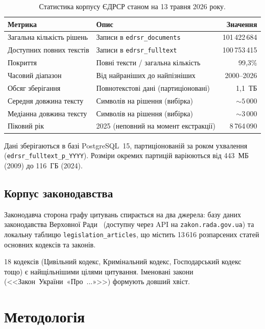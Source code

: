\documentclass[11pt]{article}
\begin{document}
\begin{table}[h]
\centering
\small
\begin{tabularx}{\textwidth}{@{}l X r@{}}
\toprule
\textbf{Метрика} & \textbf{Опис} & \textbf{Значення} \\
\midrule
Загальна кількість рішень & Записи в \texttt{edrsr\_documents} & 101\,422\,684 \\
Доступних повних текстів & Записи в \texttt{edrsr\_fulltext} & 100\,753\,415 \\
Покриття & Повні тексти / загальна кількість & 99,3\% \\
Часовий діапазон & Від найраніших до найпізніших & 2000--2026 \\
Обсяг зберігання & Повнотекстові дані (партиціоновані) & 1,1~ТБ \\
Середня довжина тексту & Символів на рішення (вибірка) & ${\sim}5\,000$ \\
Медіанна довжина тексту & Символів на рішення (вибірка) & ${\sim}3\,000$ \\
Піковий рік & 2025 (неповний на момент екстракції) & 8\,764\,090 \\
\bottomrule
\end{tabularx}
\caption{Статистика корпусу ЄДРСР станом на 13 травня 2026 року.}
\label{tab:corpus}
\end{table}

Дані зберігаються в базі PostgreSQL~15, партиціонованій за роком ухвалення (\texttt{edrsr\_fulltext\_p\_YYYY}).
Розміри окремих партицій варіюються від 443~МБ (2009) до 116~ГБ (2024).

\subsection{Корпус законодавства}

Законодавча сторона графу цитувань спирається на два джерела: базу даних законодавства Верховної Ради~\citep{zakonrada} (доступну через API на \texttt{zakon.rada.gov.ua}) та локальну таблицю \texttt{legislation\_articles}, що містить 13\,616 розпарсених статей основних кодексів та законів.

18 кодексів (Цивільний кодекс, Кримінальний кодекс, Господарський кодекс тощо) є найщільнішими цілями цитування.
Іменовані закони (<<Закон~України~«Про~...»>>) формують довший хвіст.


\section{Методологія}
\label{sec:method}
\end{document}

